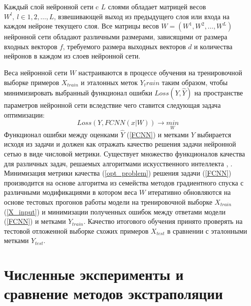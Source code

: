 \documentclass{article}
\begin{document}
	Каждый слой нейронной сети c $L$ слоями обладает матрицей весов $W^{l},\ l \in 1, 2, \dots, L$, взвешивающей выход из предыдущего слоя или входа на каждом нейроне текущего слоя. Все матрицы весов $W = (W^{1}, W^{2}, \dots, W^{L})$ нейронной сети обладают различными размерами, зависящими от размера входных векторов $f$, требуемого размера выходных векторов $d$ и количества нейронов в каждом из слоев нейронной сети.
	
	Веса нейронной сети $W$ настраиваются в процессе обучения на тренировочной выборке примеров $X_{train}$ и эталонных меток $Y_train$ таким образом, чтобы минимизировать выбранный функционал ошибки $Loss(Y, \hat{Y})$ на пространстве параметров нейронной сети вследствие чего ставится следующая задача оптимизации:
	\begin{equation}\label{opt_problem}
		Loss(Y, FCNN(x|W)) \to \underset{W}{min}
	\end{equation}
	Функционал ошибки между оценками $\hat{Y}$ (\ref{FCNN}) и метками $Y$ выбирается исходя из задачи и должен как отражать качество решения задачи нейронной сетью в виде числовой метрики. Существует множество функционалов качества для различных задач, решаемых алгоритмами искусственного интеллекта \cite{lit24}, \cite{lit25}. Минимизация метрики качества (\ref{opt_problem}) решения задачи (\ref{FCNN}) производится на основе алгоритма из семейства методов градиентного спуска с различными модификациями \cite{lit26} в котором веса $W$ итеративно обновляются на основе тестовых прогонов работы модели на тренировочной выборке $X_{train}$ (\ref{X_input}) и минимизации полученных ошибок между ответами модели (\ref{FCNN}) и метками $Y_{train}$. Качество итогового обучения принято проверять на тестовой отложенной выборке схожих примеров $X_{test}$ в сравнении с эталонными метками $Y_{test}$.
	
	
	\section*{Численные эксперименты и сравнение методов экстраполяции}
	
\end{document}
